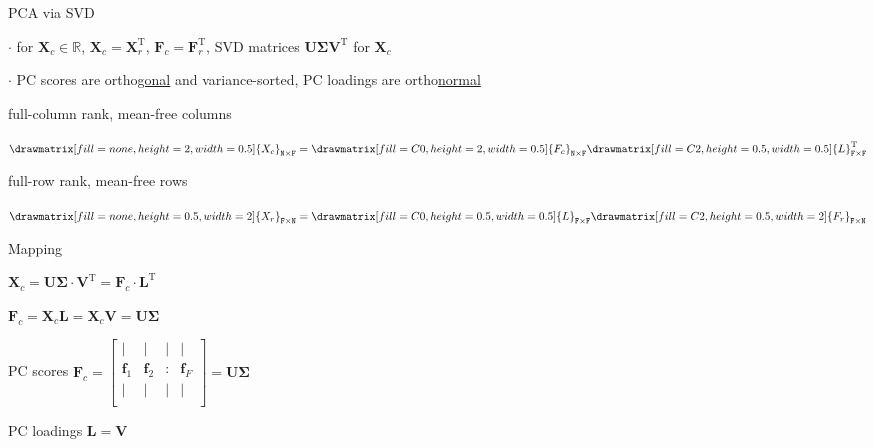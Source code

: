 \documentclass[mathserif, aspectratio=1610]{intbeamer}
\begin{document}
\begin{frame}[t]{PCA via SVD}

$\cdot$ for $\bm{X}_c \in\mathbb{R}$, $\bm{X}_c = \bm{X}_r^\mathrm{T}$, $\bm{F}_c = \bm{F}_r^\mathrm{T}$, SVD matrices $\bm{U} \bm{\Sigma} \bm{V}^\mathrm{T}$ for $\bm{X}_c$

$\cdot$ PC scores are ortho\underline{gonal} and variance-sorted, PC loadings are ortho\underline{normal}

\vspace{0.5em}
\begin{minipage}[t]{0.49\textwidth}
full-column rank, mean-free columns
\begin{center}
$
\def\F{0.5}
\def\N{2}
\drawmatrix[fill=none, height=\N, width=\F]{X_{c}}_\mathtt{N \times F}
=
\drawmatrix[fill=C0, height=\N, width=\F]{F_{c}}_\mathtt{N \times F}
\drawmatrix[fill=C2, height=\F, width=\F]{L}_\mathtt{F \times F}^\mathrm{T}
$
\end{center}
\end{minipage}
%
\begin{minipage}[t]{0.49\textwidth}
full-row rank, mean-free rows
\begin{center}
$
\def\F{0.5}
\def\N{2}
\drawmatrix[fill=none, height=\F, width=\N]{X_{r}}_\mathtt{F \times N}
=
\drawmatrix[fill=C0, height=\F, width=\F]{L}_\mathtt{F \times F}
\drawmatrix[fill=C2, height=\F, width=\N]{F_{r}}_\mathtt{F \times N}
$
\end{center}
\end{minipage}

\begin{minipage}[t]{0.49\textwidth}

Mapping

$\bm{X}_c= \bm{U} \bm{\Sigma} \cdot \bm{V}^\mathrm{T} = \bm{F}_c \cdot \bm{L}^\mathrm{T}$

$\bm{F}_c = \bm{X}_c \bm{L} = \bm{X}_c \bm{V} = \bm{U} \bm{\Sigma}$

PC scores $\bm{F}_c =
\begin{bmatrix}
| & | & | & |\\
\bm{f}_1 & \bm{f}_2 & : & \bm{f}_F\\
| & | & | & |\\
\end{bmatrix}
= \bm{U} \bm{\Sigma}$

PC loadings $\bm{L} = \bm{V}$


\end{minipage}
%
\begin{minipage}[t]{0.49\textwidth}


\end{minipage}
\end{frame}
\end{document}
